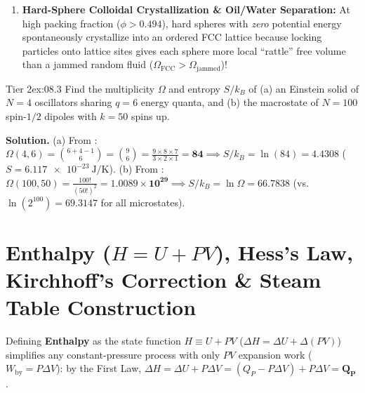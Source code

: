 \begin{twocol}[0.50]
\begin{trapbox}[Why ``Entropy = Visual Disorder'' Fails on Exams!]
\begin{enumerate}
  \item \textbf{Hard-Sphere Colloidal Crystallization \& Oil/Water Separation:} At high packing fraction ($\phi > 0.494$), hard spheres with \emph{zero} potential energy spontaneously crystallize into an ordered FCC lattice because locking particles onto lattice sites gives each sphere more local ``rattle'' free volume than a jammed random fluid ($\Omega_{\mathrm{FCC}} > \Omega_{\mathrm{jammed}}$)!
\end{enumerate}
\end{trapbox}
\begin{workedexample}{Tier 2}{ex:08.3}
Find the multiplicity $\Omega$ and entropy $S/k_B$ of (a) an Einstein solid of $N = 4$ oscillators sharing $q = 6$ energy quanta, and (b) the macrostate of $N = 100$ spin-$1/2$ dipoles with $k = 50$ spins up.
\par\smallskip\noindent
\textbf{Solution.}
(a) From : $\Omega(4,6) = \binom{6+4-1}{6} = \binom{9}{6} = \frac{9\times 8\times 7}{3\times 2\times 1} = \mathbf{84} \implies S/k_B = \ln(84) = \mathbf{4.4308}$ ($S = \SI{6.117e-23}{\joule\per\kelvin}$).
(b) From : $\Omega(100,50) = \frac{100!}{(50!)^2} = \mathbf{1.0089\times 10^{29}} \implies S/k_B = \ln\Omega = \mathbf{66.7838}$ (vs.\ $\ln(2^{100}) = 69.3147$ for all microstates).
\end{workedexample}
\end{twocol}

\section{Enthalpy ($H = U + PV$), Hess's Law, Kirchhoff's Correction \& Steam Table Construction}\label{sec:08.4}

Defining \textbf{Enthalpy} as the state function $H \equiv U + PV$ ($\Delta H = \Delta U + \Delta(PV)$) simplifies any constant-pressure process with only $PV$ expansion work ($W_{\mathrm{by}} = P\Delta V$): by the First Law, $\Delta H = \Delta U + P\Delta V = (Q_P - P\Delta V) + P\Delta V = \mathbf{Q_P}$ .

